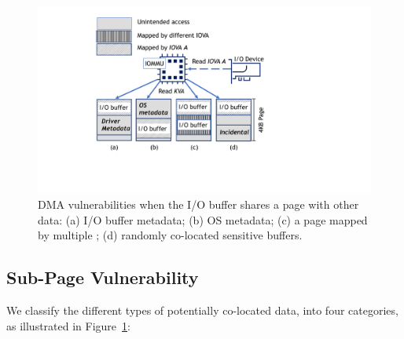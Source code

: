 \begin{figure}[t]
    \centering
    \includegraphics[width=1\columnwidth]{figs/subpage.pdf}
    \caption{\subpage{} DMA vulnerabilities when the I/O buffer shares a page with other data: (a) I/O buffer metadata; (b) OS
metadata; (c) a page mapped by multiple \iova; (d) randomly co-located sensitive buffers.}
    \label{fig:colocation}
\end{figure}

\subsection{Sub-Page Vulnerability}\label{sec:subpage}

We classify the different types of potentially co-located data, into four categories, as illustrated in Figure~\ref{fig:colocation}:


